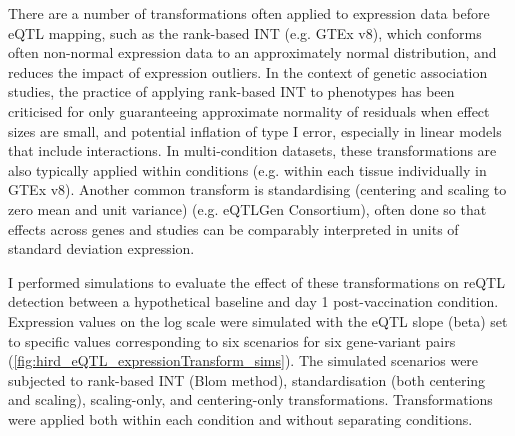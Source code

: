 There are a number of transformations often applied to expression data before \gls{eQTL} mapping, 
such as the rank-based \gls{INT} (e.g. GTEx v8\autocite{aguet2019GTExConsortiumAtlas}),
which conforms often non-normal expression data to an approximately normal distribution, and reduces the impact of expression outliers.
In the context of genetic association studies, the practice of applying rank-based \gls{INT} to phenotypes has been criticised for only guaranteeing approximate normality of residuals when effect sizes are small,
and potential inflation of type I error, especially in linear models that include interactions\autocite{beasley2009RankBasedInverseNormal}.
In multi-condition datasets, these transformations are also typically applied within conditions (e.g. within each tissue individually in GTEx v8\autocite{aguet2019GTExConsortiumAtlas}).
Another common transform is standardising (centering and scaling to zero mean and unit variance) (e.g. eQTLGen Consortium\autocite{vosa2018UnravelingPolygenicArchitecture}),
often done so that effects across genes and studies can be comparably interpreted in units of standard deviation expression\autocite{qi2018IdentifyingGeneTargets}.


I performed simulations to evaluate the effect of these transformations on reQTL detection between a hypothetical baseline and day 1 post-vaccination condition.
Expression values on the log scale were simulated with the \gls{eQTL} slope (beta) set to specific values corresponding to six scenarios for six gene-variant pairs (\cref{fig:hird_eQTL_expressionTransform_sims}).
The simulated scenarios were subjected to rank-based \gls{INT} (Blom method\autocite{beasley2009RankBasedInverseNormal}), standardisation (both centering and scaling), scaling-only, and centering-only transformations.
Transformations were applied both within each condition and without separating conditions.


